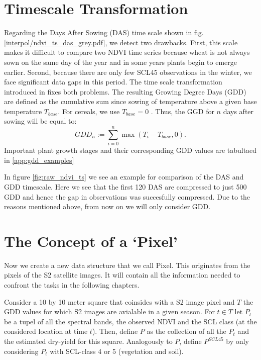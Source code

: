 \section{Timescale Transformation}\label{sec:gdd_def}
	{%
		Regarding the Days After Sowing (DAS) time scale shown in fig. \ref{interpol/ndvi_ts_das_grey.pdf}, we detect two drawbacks. First, this scale makes it difficult to compare two NDVI time series because wheat is not always sown on the same day of the year and in some years plants begin to emerge earlier. Second, because there are only few SCL45 observations in the winter, we face significant data gaps in this period. The time scale transformation introduced in \cite{mcmasterGrowingDegreedaysOne1997} fixes both problems. The resulting Growing Degree Days ({GDD}) are defined as the cumulative sum since sowing of temperature above a given base temperature $T_{base}$. For cereals, we use $T_{base}=0$ \citep{perichPixelbasedCropYield2022}. Thus, the GGD for $n$ days after sowing will be equal to:
		\begin{equation}
			\label{eq:gdd}
			GDD_n := \sum_{i=0}^n \max(T_i - T_{base}, 0).
		\end{equation}
		Important plant growth stages and their corresponding GDD values are tabultaed in \ref{app:gdd_examples}

		In figure \ref{fig:raw_ndvi_ts} we see an example for comparison of the DAS and GDD timescale. Here we see that the first 120 DAS are compressed to just 500 GDD and hence the gap in observations was succesfully compressed. Due to the reasons mentioned above, from now on we will only consider GDD.
	} 

\section{The Concept of a `Pixel'}{ \label{sec:gather_data_to_pixel}
	Now we create a new data structure that we call Pixel. This originates from the pixels of the S2 satellite images. It will contain all the information needed to confront the tasks in the following chapters. 
		
		Consider a 10 by 10 meter square that coinsides with a S2 image pixel and $T$ the GDD values for which S2 images are avialable in a given season. For $t\in T$ let $P_t$ be a tupel of all the spectral bands, the observed NDVI and the SCL class (at the considered location at time $t$). Then, define $P$ as the collection of all the $P_t$ and the estimated dry-yield for this square.
		Analogously to $P$, define $P^{SCL45}$ by only considering $P_t$ with SCL-class 4 or 5 (vegetation and soil).  
}

